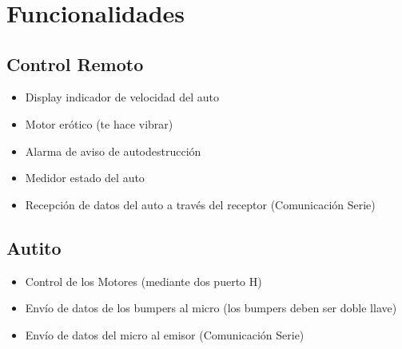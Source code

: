 \documentclass[a4paper,10pt]{article}
\title{  }
\begin{document}
	\maketitle %
	\newpage

	\tableofcontents %
	\newpage

	\section{Funcionalidades}
		\subsection{Control Remoto}
			\begin{itemize}
				\item Display indicador de velocidad del auto
				\item Motor erótico (te hace vibrar)
				\item Alarma de aviso de autodestrucción
				\item Medidor estado del auto
				\item Recepción de datos del auto a través del receptor (Comunicación Serie)
			\end{itemize}
		\subsection{Autito}
			\begin{itemize}
				\item Control de los Motores (mediante dos puerto H)
				\item Envío de datos de los bumpers al micro (los bumpers deben ser doble llave)
				\item Envío de datos del micro al emisor (Comunicación Serie)
			\end{itemize}
\end{document}
